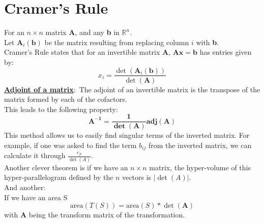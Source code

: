 \documentclass[nobib]{tufte-handout}
\newcommand{\defn}[2]{\underline{\noindent\textbf{#1}}:\ #2}
\begin{document}
\section{Cramer's Rule}
For an $n \times n$ matrix \textbf{A}, and any \textbf{b} in $\mathbb{R}^n$.\\
Let $\mathbf{A}_i(\mathbf{b})$ be the matrix resulting from replacing column $i$ with \textbf{b}.\\
Cramer's Rule states that for an invertible matrix \textbf{A}, $\mathbf{Ax = b}$ has entries given by:
\begin{equation*}
    x_i= \frac{\det(\mathbf{A}_i(\mathbf{b}))}{\det(\mathbf{A})}
\end{equation*}
\defn{Adjoint of a matrix}{The adjoint of an invertible matrix is the transpose of the matrix formed by each of the cofactors.}\\
This leads to the following property:\\
\begin{equation*}
    \mathbf{A^{-1} = \frac{1}{\det(A)}\text{adj}(A)}
\end{equation*}
This method allows us to easily find singular terms of the inverted matrix. For example, if one was asked to find the term $b_{ij}$ from the inverted matrix, we can calculate it through $\frac{c_{ji}}{\det(A)}$.\\
Another clever theorem is if we have an $n\times n$ matrix, the hyper-volume of this hyper-parallelogram defined by the $n$ vectors is $|\det(A)|$.\\
And another:\\
If we have an area S
\begin{equation*}
    \text{area}(T(S)) = \text{area}(S)*\det(\mathbf{A})
\end{equation*}
with \textbf{A} being the transform matrix of the transformation.
\end{document}
